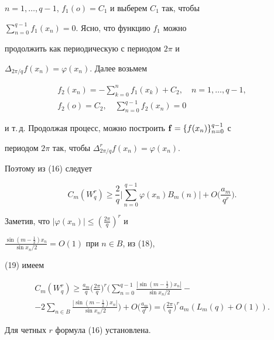 \begin{pf}
$n=1,\dotsc,q-1$, $f_1(o)=C_1$ и выберем $C_1$ так, чтобы 


$\sum\limits^{q-1}_{n=0}f_1(x_n)=0$. Ясно, что функцию $f_1$ можно 


продолжить как периодическую с периодом $2\pi$ и 


$\Delta_{2\pi/q}f(x_n)=\varphi(x_n)$. Далее возьмем 


\begin{gather*} 


f_2(x_n)=-\sum^n_{k=0}f_1(x_k)+C_2,\quad n=1,\dotsc,q-1,\\ 


f_2(o)=C_2,\quad \sum^{q-1}_{n=0}f_2(x_n)=0 


\end{gather*} 


и т.\,д. Продолжая процесс, можно построить $\bold 


f=\{f(x_n)\}^{q-1}_{n=0}$ с 


периодом $2\pi$ так, чтобы $\Delta^r_{2\pi/q}f(x_n)=\varphi(x_n)$. 


Поэтому из (16) следует 


$$ 


C_m(W^r_q)\ge\frac{2}{q}\bigg|\sum^{q-1}_{n=0}\varphi(x_n) 


B_m(n)\bigg|+O\bigg(\frac{a_m}{q^r} \bigg). 


$$ 


Заметив, что $|\varphi(x_n)|\le(\frac{2\pi}{q})^r$ и 


$\frac{\sin(m-\frac{1}{2})x_n}{\sin x_n/2}=O(1)$ при $n\in B$, из (18), 


(19) имеем 


\begin{multline*} 


C_m(W^r_q)\ge\frac{a_m}{q}\bigg(\frac{2\pi}{q} \bigg)^r\bigg( 


\sum^{q-1}_{n=0}\frac{|\sin(m-\frac{1}{2})x_n|}{\sin x_n/2} - \\ 


% 


-2\sum_{n\in B}\frac{|\sin(m-\frac{1}{2})x_n|}{\sin x_n/2}\bigg) 


+O\bigg(\frac{a_m}{q^r} \bigg)=\bigg(\frac{2\pi}{q} \bigg)^r 


a_m(L_m(q)+O(1)). 


\end{multline*} 


Для четных $r$ формула (16) установлена. 



\end{pf}
